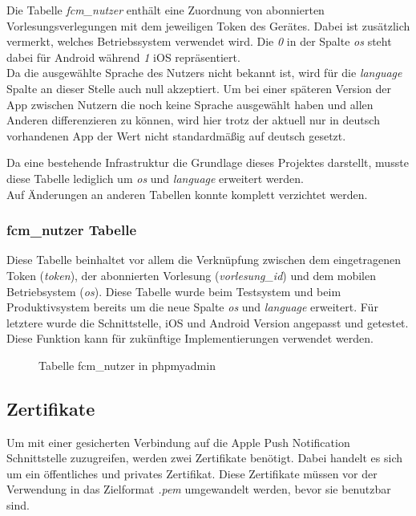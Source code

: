 Die Tabelle \textit{fcm\_nutzer} enthält eine Zuordnung von abonnierten Vorlesungsverlegungen mit dem jeweiligen Token des Gerätes. Dabei ist zusätzlich vermerkt, welches Betriebssystem verwendet wird. Die \textit{0} in der Spalte \textit{os} steht dabei für Android während \textit{1} iOS repräsentiert. \\
Da die ausgewählte Sprache des Nutzers nicht bekannt ist, wird für die \textit{language} Spalte an dieser Stelle auch null akzeptiert. Um bei einer späteren Version der App zwischen Nutzern die noch keine Sprache ausgewählt haben und allen Anderen differenzieren zu können, wird hier trotz der aktuell nur in deutsch vorhandenen App der Wert nicht standardmäßig auf deutsch gesetzt.

Da eine bestehende Infrastruktur die Grundlage dieses Projektes darstellt, musste diese Tabelle lediglich um \textit{os} und \textit{language} erweitert werden.\\
Auf Änderungen an anderen Tabellen konnte komplett verzichtet werden.

\newpage

\subsubsection{fcm\_nutzer Tabelle}
Diese Tabelle beinhaltet vor allem die Verknüpfung zwischen dem eingetragenen Token (\textit{token}), der abonnierten Vorlesung (\textit{vorlesung\_id}) und dem mobilen Betriebsystem (\textit{os}). Diese Tabelle wurde beim Testsystem und beim Produktivsystem bereits um die neue Spalte \textit{os} und \textit{language} erweitert. Für letztere wurde die Schnittstelle, iOS und Android Version angepasst und getestet. Diese Funktion kann für zukünftige Implementierungen verwendet werden.
\begin{figure}[H]
	\centering
	\caption{Tabelle fcm\_nutzer in phpmyadmin}
	\label{datenbank_nutzer}
\end{figure}

\textcolor{black}{

}

\newpage

\subsection{Zertifikate}
Um mit einer gesicherten Verbindung auf die Apple Push Notification Schnittstelle zuzugreifen, werden zwei Zertifikate benötigt. Dabei handelt es sich um ein öffentliches und privates Zertifikat. Diese Zertifikate müssen vor der Verwendung in das Zielformat \textit{.pem} umgewandelt werden, bevor sie benutzbar sind.

